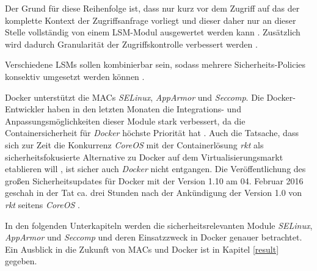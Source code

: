 \documentclass[../main.tex]{subfiles}
\begin{document}
			Der Grund für diese Reihenfolge ist, dass nur kurz vor dem Zugriff auf das  der komplette Kontext der Zugriffsanfrage vorliegt und dieser daher nur an dieser Stelle vollständig von einem LSM-Modul ausgewertet werden kann \cite[S.2]{LSMFramework}. Zusätzlich wird dadurch Granularität der Zugriffskontrolle verbessert werden \cite{LSMDesign}.


			Verschiedene LSMs sollen kombinierbar sein, sodass mehrere Sicherheits-Policies konsektiv umgesetzt werden können \cite[S.3]{LSMFramework}.







			Docker unterstützt die MACs \emph{SELinux}, \emph{AppArmor} und \emph{Seccomp}. Die Docker-Entwickler haben in den letzten Monaten die Integrations- und Anpassungsmöglichkeiten dieser Module stark verbessert, da die Containersicherheit für \emph{Docker} höchste Priorität hat \cite{githubDockerRoadmap}\cite{githubDockerChangelog}. Auch die Tatsache, dass sich zur Zeit die Konkurrenz \emph{CoreOS} mit der Containerlösung \emph{rkt} als sicherheitsfokusierte Alternative zu Docker auf dem Virtualisierungsmarkt etablieren will \cite{coreosAnnouncementRkt10}, ist sicher auch \emph{Docker} nicht entgangen.
			Die Veröffentlichung des großen Sicherheitsupdates für Docker mit der Version 1.10 am 04. Februar 2016 geschah in der Tat ca. drei Stunden nach der Ankündigung der Version 1.0 von \emph{rkt} seitens \emph{CoreOS} \cite{hnAnnouncementDocker110}\cite{hnAnnouncementRkt10}.

			In den folgenden Unterkapiteln werden die sicherheitsrelevanten Module \emph{SELinux}, \emph{AppArmor} und \emph{Seccomp} und deren Einsatzzweck in Docker genauer betrachtet. Ein Ausblick in die Zukunft von MACs und Docker ist in Kapitel \ref{result} gegeben.
\end{document}
